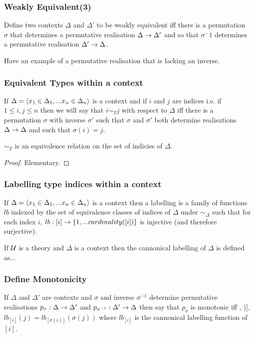\documentclass[10pt,a4paper]{scrartcl}
\begin{document}
\subsubsection{Weakly Equivalent(3)}
Define two contexts $\Delta$ and $\Delta'$ to be weakly equivalent iff there is a permutation $\sigma$ that determines a permutative realisation   $\Delta \rightarrow \Delta'$ and so that $\sigma{^-1}$ 
determines a permutative realisation $\Delta' \rightarrow \Delta$. 

\begin{note}[Example]
Have an example of a permutative realisation that is lacking an inverse.
\end{note}

\subsubsection{Equivalent Types within a context}
If $\Delta=\langle x_1 \in \Delta_1,... x_{n} \in \Delta_{n}\rangle$ is a context and if $i$ and $j$ are indices i.e. if $1 \leq i,j \leq n$ then we will say that $i \sim_T j$ with respect to $\Delta$ 
iff
there is a permutation $\sigma$ with inverse $\sigma'$ such that $\sigma$ and $\sigma'$ both determine realisations $\Delta \rightarrow \Delta$ and such that $\sigma(i)=j$.  
\begin{lemma}
$\sim_T$ is an equivalence relation on the set of indicies of $\Delta$.
\end{lemma}
\begin{proof}
Elementary.
\end{proof}

\subsubsection{Labelling type indices within a context}
If $\Delta=\langle x_1 \in \Delta_1,... x_{n} \in \Delta_{n}\rangle$ is a context then a labelling is a family of functions $lb$ indexed by the set of equivalence classes of indices of $\Delta$ under $\sim_\Delta$
such that for each index $i$, $lb:[i] \rightarrow \left\{1,...cardinality([i])\right\}$ is injective (and therefore surjective).

\begin{definition}
If  $\mathcal{U}$ is a theory and $\Delta$ is a context then the cannonical labelling of $\Delta$ is defined as...  
\end{definition}
\subsubsection{Define Monotonicity}
If $\Delta$ and $\Delta'$ are contexts and $\sigma$ and inverse $\sigma^{-1}$ determine permutative realisations $p_\sigma: \Delta \rightarrow  \Delta'$ and
$p_{\sigma^{-1}}: \Delta' \rightarrow \Delta$ then say that $p_\sigma$ is monotonic iff \foreachi, \foreachj[card([i])], $lb_{[i]}(j)=lb_{[\sigma(i)]}(\sigma(j))$
where $lb_[i]$ is the cannonical labelling function of $[i]$.
\end{document}
